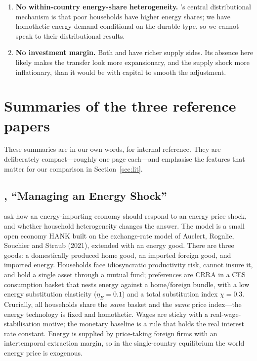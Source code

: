 \documentclass[11pt,a4paper]{article}
\begin{document}
\begin{enumerate}
\item \textbf{No within-country energy-share heterogeneity.}
\citet{Bayer2026}'s central distributional mechanism is that poor households
have higher energy shares; we have homothetic energy demand conditional on
the durable type, so we cannot speak to their distributional results.

\item \textbf{No investment margin.} Both \citet{Bayer2026} and
\citet{ARS2024} have richer supply sides. Its absence here likely makes the
transfer look more expansionary, and the supply shock more inflationary, than
it would be with capital to smooth the adjustment.

\end{enumerate}

\appendix

\section{Summaries of the three reference papers}
\label{sec:summaries}

These summaries are in our own words, for internal reference. They are
deliberately compact---roughly one page each---and emphasise the features that
matter for our comparison in Section~\ref{sec:lit}.

\subsection{\citet{ARS2024}, ``Managing an Energy Shock''}

\citet{ARS2024} ask how an energy-importing economy should respond to an energy
price shock, and whether household heterogeneity changes the answer. The model
is a small open economy HANK built on the exchange-rate model of Auclert,
Rognlie, Souchier and Straub (2021), extended with an energy good. There are
three goods: a domestically produced home good, an imported foreign good, and
imported energy. Households face idiosyncratic productivity risk, cannot insure
it, and hold a single asset through a mutual fund; preferences are CRRA in a
CES consumption basket that nests energy against a home/foreign bundle, with a
low energy substitution elasticity ($\eta_E=0.1$) and a total substitution
index $\chi=0.3$. Crucially, all households share the \emph{same} basket and
the \emph{same} price index---the energy technology is fixed and homothetic.
Wages are sticky with a real-wage-stabilisation motive; the monetary baseline
is a rule that holds the real interest rate constant. Energy is supplied by
price-taking foreign firms with an intertemporal extraction margin, so in the
single-country equilibrium the world energy price is exogenous.
\end{document}
